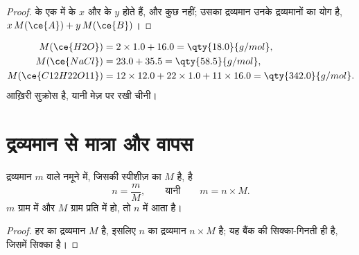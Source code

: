 \begin{proof}
  के एक  में   के $x$  और
  के $y$  होते हैं, और कुछ नहीं; उसका द्रव्यमान उनके द्रव्यमानों का
योग है, $x\,M(\ce{A}) + y\,M(\ce{B})$।
\end{proof}

\begin{example}[तीन मोलर द्रव्यमान]\label{ex:g10:the-mole:three}
\begin{align*}
  M(\ce{H2O}) &= 2 \times 1.0 + 16.0 = \qty{18.0}{g/mol},\\
  M(\ce{NaCl}) &= 23.0 + 35.5 = \qty{58.5}{g/mol},\\
  M(\ce{C12H22O11}) &= 12 \times 12.0 + 22 \times 1.0 + 11 \times 16.0
     = \qty{342.0}{g/mol}.
\end{align*}
आख़िरी सुक्रोस है, यानी मेज़ पर रखी चीनी।
\end{example}

\section{द्रव्यमान से मात्रा और वापस}

\begin{proposition}[द्रव्यमान और मात्रा]\label{prop:g10:the-mole:mass}
द्रव्यमान $m$ वाले नमूने में, जिसकी स्पीशीज़ का  $M$ है,  है
\[
  n = \frac{m}{M}, \qquad\text{यानी}\qquad m = n \times M .
\]
$m$ ग्राम में और $M$ ग्राम प्रति  में हो, तो $n$  में आता है।
\end{proposition}

\begin{proof}
हर  का द्रव्यमान $M$ है, इसलिए $n$  का द्रव्यमान $n \times M$ है; यह
बैंक की सिक्का-गिनती ही है, जिसमें  सिक्का है।
\end{proof}

